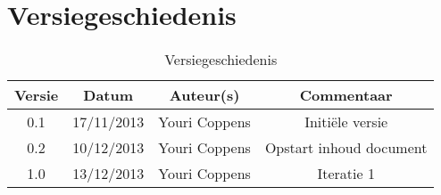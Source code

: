 \chapter{Versiegeschiedenis}

\begin{table}[htbp]
	\centering
	\begin{tabular} {|c|c|c|c|}
	    \hline
		\textbf{Versie} & \textbf{Datum} 	& \textbf{Auteur(s)} & \textbf{Commentaar} \\
		\hline
		0.1	& 17/11/2013	& Youri Coppens	& Initi\"{e}le versie\\
		\hline
		0.2	& 10/12/2013	& Youri Coppens	& Opstart inhoud document\\
		\hline
		1.0	& 13/12/2013	& Youri Coppens	& Iteratie 1\\ 
		\hline
	\end{tabular}
	\caption{Versiegeschiedenis}
\end{table}
